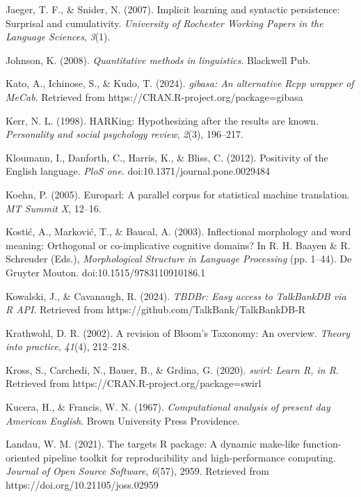 \documentclass[
  letterpaper,
  krantz1]{latex/krantz-mod}
\newlength{\cslhangindent}
\newenvironment{CSLReferences}[2] %
 {\begin{list}{}{%
  \setlength{\itemindent}{0pt}
  \setlength{\leftmargin}{0pt}
  \setlength{\parsep}{0pt}
  \ifodd #1
   \setlength{\leftmargin}{\cslhangindent}
   \setlength{\itemindent}{-1\cslhangindent}
  \fi
  \setlength{\itemsep}{#2\baselineskip}}}
 {\end{list}}
\theoremstyle{definition}
\theoremstyle{definition}
\theoremstyle{remark}
\begin{document}
\begin{CSLReferences}{1}{0}
Jaeger, T. F., \& Snider, N. (2007). Implicit learning and syntactic
persistence: {Surprisal} and cumulativity. \emph{University of Rochester
Working Papers in the Language Sciences}, \emph{3}(1).

Johnson, K. (2008). \emph{Quantitative methods in linguistics}.
Blackwell Pub.

Kato, A., Ichinose, S., \& Kudo, T. (2024). \emph{{gibasa}: An
alternative {Rcpp} wrapper of {MeCab}}. Retrieved from
https://CRAN.R-project.org/package=gibasa

Kerr, N. L. (1998). {HARKing}: {Hypothesizing} after the results are
known. \emph{Personality and social psychology review}, \emph{2}(3),
196--217.

Kloumann, I., Danforth, C., Harris, K., \& Bliss, C. (2012). Positivity
of the {English} language. \emph{PloS one}.
doi:10.1371/journal.pone.0029484

Koehn, P. (2005). Europarl: A parallel corpus for statistical machine
translation. \emph{MT Summit X}, 12--16.

Kostić, A., Marković, T., \& Baucal, A. (2003). Inflectional morphology
and word meaning: {Orthogonal} or co-implicative cognitive domains? In
R. H. Baayen \& R. Schreuder (Eds.), \emph{Morphological {Structure} in
{Language Processing}} (pp. 1--44). De Gruyter Mouton.
doi:10.1515/9783110910186.1

Kowalski, J., \& Cavanaugh, R. (2024). \emph{{TBDBr}: Easy access to
TalkBankDB via {R API}}. Retrieved from
https://github.com/TalkBank/TalkBankDB-R

Krathwohl, D. R. (2002). A revision of {Bloom}'s {Taxonomy}: {An}
overview. \emph{Theory into practice}, \emph{41}(4), 212--218.

Kross, S., Carchedi, N., Bauer, B., \& Grdina, G. (2020). \emph{{swirl}:
Learn {R}, in {R}}. Retrieved from
https://CRAN.R-project.org/package=swirl

Kucera, H., \& Francis, W. N. (1967). \emph{Computational analysis of
present day {American English}}. Brown University Press Providence.

Landau, W. M. (2021). The targets {R} package: A dynamic make-like
function-oriented pipeline toolkit for reproducibility and
high-performance computing. \emph{Journal of Open Source Software},
\emph{6}(57), 2959. Retrieved from https://doi.org/10.21105/joss.02959


\end{CSLReferences}
\end{document}
